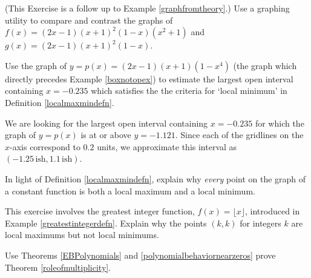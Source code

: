 \documentclass{ximera}
\begin{document}
\begin{problem}\label{comparegraphfromtheoryexample}  (This Exercise is a follow up to Example \ref{graphfromtheory}.)  Use a graphing utility to  compare and contrast the graphs of $f(x) = (2x-1)(x+1)^2(1-x)(x^2+1)$ and $g(x) = (2x-1)(x+1)^2(1-x)$.
\end{problem}

\begin{problem}  Use the graph of $y= p(x) = (2x-1)(x+1)(1-x^4)$ (the graph which directly precedes Example \ref{boxnotopex}) to estimate the largest open interval containing $x = -0.235$ which satisfies the the criteria for `local minimum'  in Definition \ref{localmaxmindefn}.

\begin{solution}
    We are looking for the largest open interval containing $x = -0.235$ for which the graph of $y = p(x)$ is at or above $y=-1.121$.  Since each of the gridlines on the $x$-axis correspond to $0.2$ units, we approximate this interval as  $(-1.25 \, \text{ish}, 1.1 \, \text{ish})$.
\end{solution}
\end{problem}

\begin{problem}  In light of Definition \ref{localmaxmindefn}, explain why \textit{every} point on the graph of a constant function is both a local maximum and a local minimum.
\end{problem}

\begin{problem}
This exercise involves the greatest integer function, $f(x) = \lfloor x \rfloor$,  introduced in Example \ref{greatestintegerdefn}.  Explain why the points $(k,k)$ for integers $k$ are local maximums but not local minimums.
\end{problem}

\begin{problem}
Use Theorems  \ref{EBPolynomials}  and \ref{polynomialbehaviornearzeros} prove Theorem \ref{roleofmultiplicity}.
\end{problem}
\end{document}
